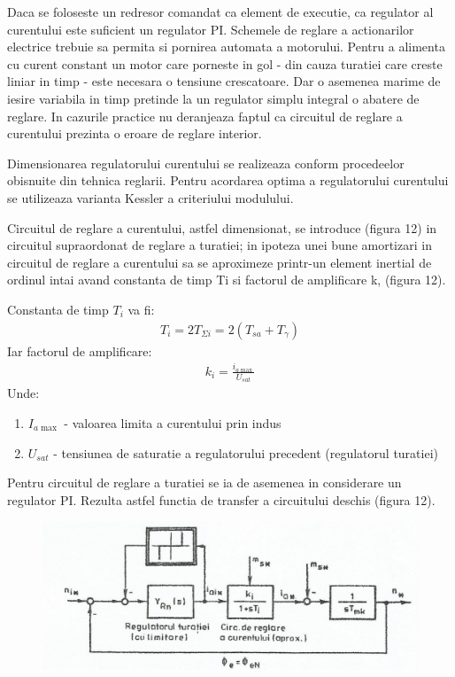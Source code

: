\documentclass[11pt]{article}
\begin{document}
Daca se foloseste un redresor comandat ca element de executie, ca regulator al curentului este suficient un regulator PI. 
Schemele de reglare a actionarilor electrice trebuie sa permita si pornirea automata a motorului. Pentru a alimenta cu curent constant un motor care porneste in gol - din cauza turatiei care creste liniar in timp - este necesara o tensiune crescatoare. Dar o asemenea marime de iesire variabila in timp pretinde la un regulator simplu integral o abatere de reglare. In cazurile practice nu deranjeaza faptul ca circuitul de reglare a curentului prezinta o eroare de reglare interior. 

Dimensionarea regulatorului curentului se realizeaza conform procedeelor obisnuite din tehnica reglarii. Pentru acordarea optima a regulatorului curentului se utilizeaza varianta Kessler a criteriului modulului.

Circuitul de reglare a curentului, astfel dimensionat, se introduce (figura 12) in circuitul supraordonat de reglare a turatiei; in ipoteza unei bune amortizari in circuitul de reglare a curentului sa se aproximeze printr-un element inertial de ordinul intai avand constanta de timp Ti si factorul de amplificare k, (figura 12).

Constanta de timp $T_i$ va fi:
\begin{align}
T_i=2T_{\Sigma i}=2(T_{sa}+T_\gamma)
\end{align}
Iar factorul de amplificare:
\begin{align}
k_i=\frac{i_{a\max}}{U_{sat}}
\end{align}
Unde:
\begin{enumerate}[label=$\bullet$]
	\item $I_{a\max}$ - valoarea limita a curentului prin indus 
	\item $U_{sat}$ - tensiunea de saturatie a regulatorului precedent (regulatorul turatiei) 
\end{enumerate}
Pentru circuitul de reglare a turatiei se ia de asemenea in considerare un regulator PI. Rezulta astfel functia de transfer a circuitului deschis (figura 12).
\begin{figure}[H]
	\centering
	\includegraphics[width=.9\linewidth]{fig13.png}
	\label{fig:test2}
\end{figure}
\end{document}
